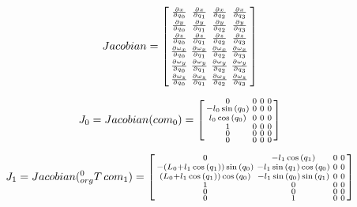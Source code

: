 \documentclass{article}
\begin{document}
\begin{equation}
	Jacobian = 
	\begin{bsmallmatrix}
	\frac{\partial x}{\partial q_0} & \frac{\partial x}{\partial q_1} & \frac{\partial x}{\partial q_2} & \frac{\partial x}{\partial q_3}\\
	\frac{\partial y}{\partial q_0} & \frac{\partial y}{\partial q_1} & \frac{\partial y}{\partial q_2} & \frac{\partial y}{\partial q_3}\\
	\frac{\partial z}{\partial q_0} & \frac{\partial z}{\partial q_1} & \frac{\partial z}{\partial q_2} & \frac{\partial z}{\partial q_3}\\
	\frac{\partial \omega_x}{\partial q_0} & \frac{\partial \omega_x}{\partial q_1} & \frac{\partial \omega_x}{\partial q_2} & \frac{\partial \omega_x}{\partial q_3}\\
	\frac{\partial \omega_y}{\partial q_0} & \frac{\partial \omega_y}{\partial q_1} & \frac{\partial \omega_y}{\partial q_2} & \frac{\partial \omega_y}{\partial q_3}\\
	\frac{\partial \omega_z}{\partial q_0} & \frac{\partial \omega_z}{\partial q_1} & \frac{\partial \omega_z}{\partial q_2} & \frac{\partial \omega_z}{\partial q_3}\\
	\end{bsmallmatrix}
\end{equation}

\begin{equation}
	J_0 =  Jacobian(com_0) =
	\begin{bsmallmatrix}
	0 & 0 & 0 & 0\\
	- l_{0} \sin{(q_{0} )} & 0 & 0 & 0\\
	l_{0} \cos{(q_{0} )} & 0 & 0 & 0\\
	1 & 0 & 0 & 0\\
	0 & 0 & 0 & 0\\
	0 & 0 & 0 & 0
	\end{bsmallmatrix}
\end{equation}

\begin{equation}
	J_1 = Jacobian({}_{org}^0 T \, com_1) =
	\begin{bsmallmatrix}
	0 & - l_{1} \cos{(q_{1} )} & 0 & 0\\- (L_{0} + l_{1} \cos{(q_{1} )}) \sin{(q_{0} )} & - l_{1} \sin{(q_{1} )} \cos{(q_{0} )} & 0 & 0\\
	(L_{0} + l_{1} \cos{(q_{1} )}) \cos{(q_{0} )} & - l_{1} \sin{(q_{0} )} \sin{(q_{1} )} & 0 & 0\\
	1 & 0 & 0 & 0\\
	0 & 0 & 0 & 0\\
	0 & 1 & 0 & 0
\end{bsmallmatrix}
\end{equation}
\end{document}
